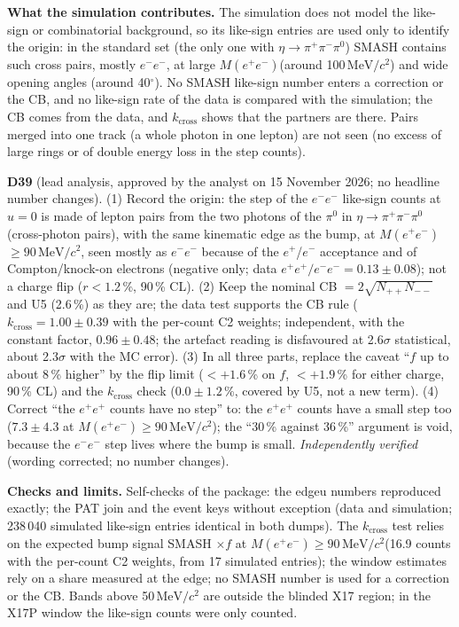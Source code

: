 \documentclass[11pt,a4paper]{article}
\newcommand{\piz}{\ensuremath{\pi^{0}}\xspace}
\newcommand{\pipi}{\ensuremath{\pi^{+}\pi^{-}}\xspace}
\newcommand{\Mee}{\ensuremath{M(e^{+}e^{-})}\xspace}
\newcommand{\MeVcc}{\ensuremath{\mathrm{MeV}/c^{2}}\xspace}
\newcommand{\notebox}[1]{\par\noindent\colorbox{orange!10}{\parbox{\dimexpr\linewidth-2\fboxsep\relax}{#1}}\par}
\begin{document}
\textbf{What the simulation contributes.} The simulation does not model the like-sign or combinatorial background, so its like-sign entries
are used only to identify the origin: in the standard set (the only one with $\eta\to\pipi\piz$) SMASH contains such cross pairs, mostly
$e^-e^-$, at large \Mee (around 100\,\MeVcc) and wide opening angles (around 40$^\circ$). No SMASH like-sign number enters a correction or the CB,
and no like-sign rate of the data is compared with the simulation; the CB comes from the data, and $k_{\mathrm{cross}}$ shows that the partners are
there. Pairs merged into one track (a whole photon in one lepton) are not seen (no excess of large rings or of double energy loss in the step
counts).

\notebox{\textbf{D39} (lead analysis, approved by the analyst on 15 November 2026; no headline number changes). (1) Record the origin: the step
of the $e^-e^-$ like-sign counts at $u=0$ is made of lepton pairs from the two photons of the \piz in $\eta\to\pipi\piz$ (cross-photon pairs),
with the same kinematic edge as the bump, at \Mee$\ge90$\,\MeVcc, seen mostly as $e^-e^-$ because of the $e^+$/$e^-$ acceptance and of
Compton/knock-on electrons (negative only; data $e^+e^+/e^-e^-=0.13\pm0.08$); not a charge flip ($r<1.2$\,\%, 90\,\% CL). (2) Keep the nominal CB
$=2\sqrt{N_{++}N_{--}}$ and U5 (2.6\,\%) as they are; the data test supports the CB rule ($k_{\mathrm{cross}}=1.00\pm0.39$ with the per-count C2
weights; independent, with the constant factor, $0.96\pm0.48$; the artefact reading is disfavoured at 2.6$\sigma$ statistical, about 2.3$\sigma$
with the MC error). (3) In all three parts, replace the caveat ``$f$ up to about 8\,\% higher'' by the flip limit ($<+1.6$\,\% on $f$,
$<+1.9$\,\% for either charge, 90\,\% CL) and the $k_{\mathrm{cross}}$ check ($0.0\pm1.2$\,\%, covered by U5, not a new term). (4) Correct ``the
$e^+e^+$ counts have no step'' to: the $e^+e^+$ counts have a small step too ($7.3\pm4.3$ at \Mee$\ge90$\,\MeVcc); the ``30\,\% against 36\,\%''
argument is void, because the $e^-e^-$ step lives where the bump is small. \emph{Independently verified} (wording corrected; no number changes).}

\textbf{Checks and limits.} Self-checks of the package: the edgeu numbers reproduced exactly; the PAT join and the event keys without
exception (data and simulation; 238\,040 simulated like-sign entries identical in both dumps). The $k_{\mathrm{cross}}$ test relies on the expected bump
signal SMASH $\times f$ at \Mee$\ge90$\,\MeVcc (16.9 counts with the per-count C2 weights, from 17 simulated entries); the window estimates rely
on a share measured at the edge; no SMASH number is used for a correction or the CB. Bands above 50\,\MeVcc are outside the blinded X17 region;
in the X17P window the like-sign counts were only counted.
\end{document}
